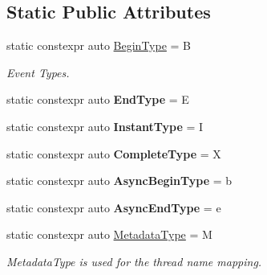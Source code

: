 \subsection*{Static Public Attributes}
\begin{DoxyCompactItemize}
\item 
\mbox{\label{structglow_1_1_trace_event_af2b2fc075debe344ecec4e5627d00032}} 
static constexpr auto \hyperlink{structglow_1_1_trace_event_af2b2fc075debe344ecec4e5627d00032}{Begin\+Type} = \textquotesingle{}B\textquotesingle{}
\begin{DoxyCompactList}\small\item\em Event Types. \end{DoxyCompactList}\item 
\mbox{\label{structglow_1_1_trace_event_a9acf3589a6db73613e453561da27c99a}} 
static constexpr auto {\bfseries End\+Type} = \textquotesingle{}E\textquotesingle{}
\item 
\mbox{\label{structglow_1_1_trace_event_a7b34339ee5bc2d10db2caac328f36d5d}} 
static constexpr auto {\bfseries Instant\+Type} = \textquotesingle{}I\textquotesingle{}
\item 
\mbox{\label{structglow_1_1_trace_event_aeeb5c2fa3918157b2a48785f35fb7aee}} 
static constexpr auto {\bfseries Complete\+Type} = \textquotesingle{}X\textquotesingle{}
\item 
\mbox{\label{structglow_1_1_trace_event_aa981a8b21809ca177f5f59079b4774b3}} 
static constexpr auto {\bfseries Async\+Begin\+Type} = \textquotesingle{}b\textquotesingle{}
\item 
\mbox{\label{structglow_1_1_trace_event_a4c135f48d761a415a778d61d5195bf98}} 
static constexpr auto {\bfseries Async\+End\+Type} = \textquotesingle{}e\textquotesingle{}
\item 
\mbox{\label{structglow_1_1_trace_event_aa41e6b466b2f7d8a8e569068c7b70a0a}} 
static constexpr auto \hyperlink{structglow_1_1_trace_event_aa41e6b466b2f7d8a8e569068c7b70a0a}{Metadata\+Type} = \textquotesingle{}M\textquotesingle{}
\begin{DoxyCompactList}\small\item\em Metadata\+Type is used for the thread name mapping. \end{DoxyCompactList}\end{DoxyCompactItemize}


